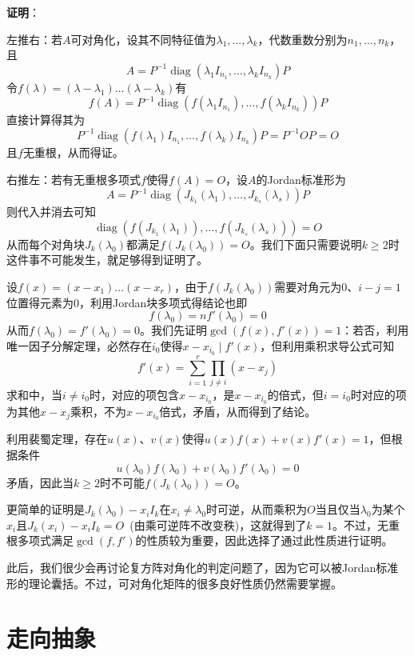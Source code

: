 \documentclass[a4paper,UTF8,fontset=windows,AutoFakeBold]{ctexart}
\DeclareMathOperator{\diag}{diag}
\newcommand*{\note}{\noindent *}
\newcommand{\proo}[1]{{\vspace{5pt}\kaishu\noindent\textbf{证明}：\vspace{-3pt}
\begin{compactitem}
    \item[] #1
\end{compactitem}
}}
\begin{document}
\proo{
    左推右：若$A$可对角化，设其不同特征值为$\lambda_1,\dots,\lambda_k$，代数重数分别为$n_1,\dots,n_k$，且
    $$A=P^{-1}\diag(\lambda_1I_{n_1},\dots,\lambda_kI_{n_k})P$$
    令$f(\lambda)=(\lambda-\lambda_1)\dots(\lambda-\lambda_k)$有
    $$f(A)=P^{-1}\diag(f(\lambda_1I_{n_1}),\dots,f(\lambda_kI_{n_k}))P$$
    直接计算得其为
    $$P^{-1}\diag(f(\lambda_1)I_{n_1},\dots,f(\lambda_k)I_{n_k})P=P^{-1}OP=O$$
    且$f$无重根，从而得证。

    右推左：若有无重根多项式$f$使得$f(A)=O$，设$A$的Jordan标准形为
    $$A=P^{-1}\diag(J_{k_1}(\lambda_1),\dots,J_{k_s}(\lambda_s))P$$
    则代入并消去可知
    $$\diag(f(J_{k_1}(\lambda_1)),\dots,f(J_{k_s}(\lambda_s)))=O$$
    从而每个对角块$J_k(\lambda_0)$都满足$f(J_k(\lambda_0))=O$。我们下面只需要说明$k\ge2$时这件事不可能发生，就足够得到证明了。

    设$f(x)=(x-x_1)\dots (x-x_r)$，由于$f(J_k(\lambda_0))$需要对角元为0、$i-j=1$位置得元素为0，利用Jordan块多项式得结论也即
    $$f(\lambda_0)=nf'(\lambda_0)=0$$
    从而$f(\lambda_0)=f'(\lambda_0)=0$。我们先证明$\gcd(f(x),f'(x))=1$：若否，利用唯一因子分解定理，必然存在$i_0$使得$x-x_{i_0}\mid f'(x)$，但利用乘积求导公式可知
    $$f'(x)=\sum_{i=1}^r\prod_{j\ne i}(x-x_j)$$
    求和中，当$i\ne i_0$时，对应的项包含$x-x_{i_0}$，是$x-x_{i_0}$的倍式，但$i=i_0$时对应的项为其他$x-x_j$乘积，不为$x-x_{i_0}$倍式，矛盾，从而得到了结论。

    利用裴蜀定理，存在$u(x)$、$v(x)$使得$u(x)f(x)+v(x)f'(x)=1$，但根据条件
    $$u(\lambda_0)f(\lambda_0)+v(\lambda_0)f'(\lambda_0)=0$$
    矛盾，因此当$k\ge2$时不可能$f(J_k(\lambda_0))=O$。
}

\note 更简单的证明是$J_k(\lambda_0)-x_iI_k$在$x_i\ne\lambda_0$时可逆，从而乘积为$O$当且仅当$\lambda_0$为某个$x_i$且$J_k(x_i)-x_iI_k=O$\ (由乘可逆阵不改变秩)，这就得到了$k=1$。不过，无重根多项式满足$\gcd(f,f')$的性质较为重要，因此选择了通过此性质进行证明。

\note 此后，我们很少会再讨论复方阵对角化的判定问题了，因为它可以被Jordan标准形的理论囊括。不过，可对角化矩阵的很多良好性质仍然需要掌握。

\section{走向抽象}
\end{document}
